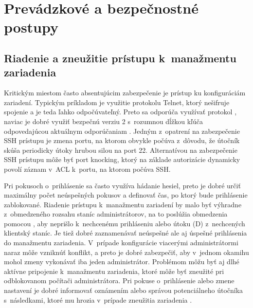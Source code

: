 \section{Prevádzkové a bezpečnostné postupy}

\subsection{Riadenie a zneužitie prístupu k~manažmentu zariadenia}
Kritickým miestom často absentujúcim zabezpečenie je prístup ku konfiguráciám zariadení. Typickým príkladom je využitie protokolu Telnet, ktorý nešifruje spojenie a je teda ľahko odpočúvateľný. Preto sa odporúča využívať protokol , naviac je dobré využiť bezpečnú verziu 2 s~rozumnou dĺžkou kľúča odpovedajúcou aktuálnym odporúčaniam \cite{CIS_DrTLsgXv24lxeIIM}\cite{Barker2019}. Jedným z~opatrení na zabezpečenie SSH prístupu je zmena portu, na ktorom obvykle počúva z~dôvodu, že útočník skúša periodicky útoky hrubou silou na  port 22. Alternatívou na zabezpečenie SSH prístupu môže byť port knocking, ktorý na základe autorizácie dynamicky povolí záznam v~ACL k~portu, na ktorom počúva SSH.

Pri pokusoch o~prihlásenie sa často využíva hádanie hesiel, preto je dobré určiť maximálny počet neúspešných pokusov a definovať čas, po ktorý bude prihlásenie zablokované. Riadenie prístupu k~manažmentu zariadení by malo byť výhradne z~obmedzeného rozsahu staníc administrátorov, na to poslúžia obmedzenia pomocou , aby neprišlo k~nechcenému prihláseniu alebo útoku (D) z~nechcených klientský staníc. Je tiež dobré zaznamenávať neúspešné ale aj úspešné prihlásenia do manažmentu zariadenia. V~prípade konfigurácie viacerými administrátormi naraz môže vzniknúť konflikt, a preto je dobré zabezpečiť, aby v~jednom okamihu mohol zmeny vykonávať iba jeden administrátor. Problémom môžu byť aj dlhé aktívne pripojenie k~manažmentu zariadenia, ktoré môže byť zneužité pri odblokovanom počítači administrátora. Pri pokuse o~prihlásenie alebo zmene nastavení je dobré informovať oznámením alebo správou potenciálneho útočníka s~následkami, ktoré mu hrozia v~prípade zneužitia zariadenia \cite{CIS_DrTLsgXv24lxeIIM}. 

